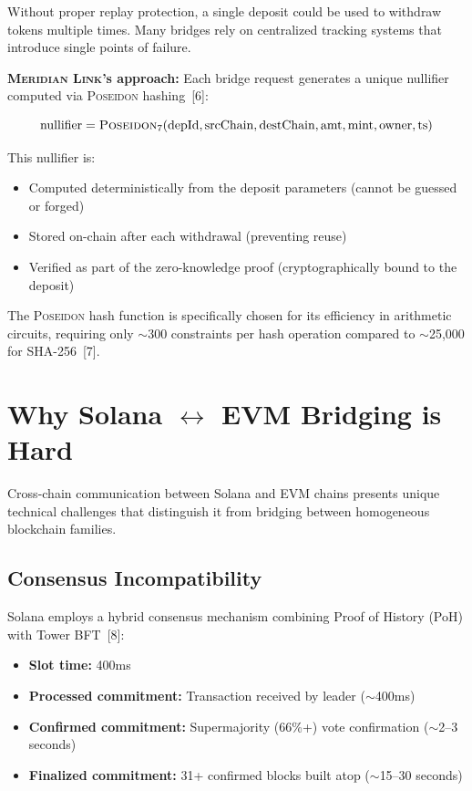 \documentclass[11pt,a4paper,twoside]{article}
\newcommand{\protocol}{\textsc{Meridian Link}}
\newcommand{\poseidon}{\textsc{Poseidon}}
\begin{document}
Without proper replay protection, a single deposit could be used to withdraw tokens multiple times. Many bridges rely on centralized tracking systems that introduce single points of failure.

\textbf{\protocol{}'s approach:} Each bridge request generates a unique nullifier computed via \poseidon{} hashing~[6]:

\begin{equation}
\text{nullifier} = \poseidon_7(\text{depId}, \text{srcChain}, \text{destChain}, \text{amt}, \text{mint}, \text{owner}, \text{ts})
\end{equation}

This nullifier is:
\begin{itemize}
    \item Computed deterministically from the deposit parameters (cannot be guessed or forged)
    \item Stored on-chain after each withdrawal (preventing reuse)
    \item Verified as part of the zero-knowledge proof (cryptographically bound to the deposit)
\end{itemize}

The \poseidon{} hash function is specifically chosen for its efficiency in arithmetic circuits, requiring only $\sim$300 constraints per hash operation compared to $\sim$25,000 for SHA-256~[7].

\section{Why Solana $\leftrightarrow$ EVM Bridging is Hard}
\label{sec:challenges}

Cross-chain communication between Solana and EVM chains presents unique technical challenges that distinguish it from bridging between homogeneous blockchain families.

\subsection{Consensus Incompatibility}

Solana employs a hybrid consensus mechanism combining Proof of History (PoH) with Tower BFT~[8]:
\begin{itemize}
    \item \textbf{Slot time:} 400ms
    \item \textbf{Processed commitment:} Transaction received by leader ($\sim$400ms)
    \item \textbf{Confirmed commitment:} Supermajority (66\%+) vote confirmation ($\sim$2--3 seconds)
    \item \textbf{Finalized commitment:} 31+ confirmed blocks built atop ($\sim$15--30 seconds)
\end{itemize}
\end{document}
